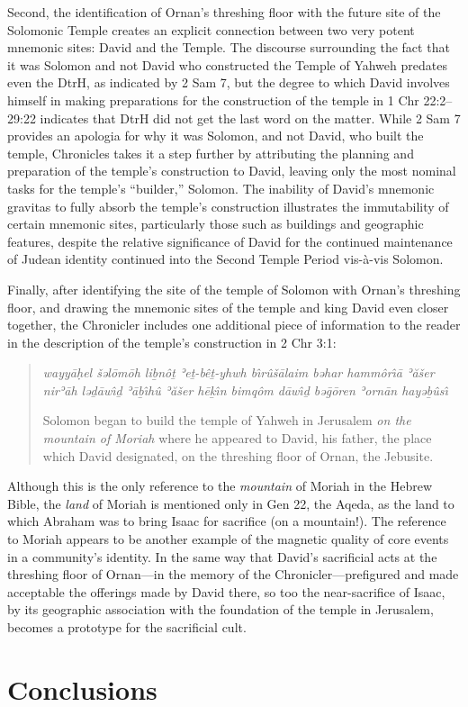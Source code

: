 Second, the identification of Ornan's threshing floor with the future
site of the Solomonic Temple creates an explicit connection between two
very potent mnemonic sites: David and the Temple. The discourse
surrounding the fact that it was Solomon and not David who constructed
the Temple of Yahweh predates even the DtrH, as indicated by 2 Sam 7,
but the degree to which David involves himself in making preparations
for the construction of the temple in 1 Chr 22:2--29:22 indicates that
DtrH did not get the last word on the matter. While 2 Sam 7 provides an
apologia for why it was Solomon, and not David, who built the temple,
Chronicles takes it a step further by attributing the planning and
preparation of the temple's construction to David, leaving only the most
nominal tasks for the temple's ``builder,'' Solomon. The inability of
David's mnemonic gravitas to fully absorb the temple's construction
illustrates the immutability of certain mnemonic sites, particularly
those such as buildings and geographic features, despite the relative
significance of David for the continued maintenance of Judean identity
continued into the Second Temple Period vis-à-vis Solomon.

Finally, after identifying the site of the temple of Solomon with
Ornan's threshing floor, and drawing the mnemonic sites of the temple
and king David even closer together, the Chronicler includes one
additional piece of information to the reader in the description of the
temple's construction in 2 Chr 3:1:

\begin{quote}
\emph{wayyāḥel šəlōmōh liḇnôṯ ʾeṯ-bêṯ-yhwh bı̂rûšālaim bəhar hammôrı̂ā
ʾăšer nirʾāh ləḏāwı̂ḏ ʾāḇı̂hû ʾăšer hēḵı̂n bimqôm dāwı̂ḏ bəḡōren ʾornān
hayəḇûsı̂}

Solomon began to build the temple of Yahweh in Jerusalem \emph{on the
mountain of Moriah} where he appeared to David, his father, the place
which David designated, on the threshing floor of Ornan, the Jebusite.
\end{quote}

Although this is the only reference to the \emph{mountain} of Moriah in
the Hebrew Bible, the \emph{land} of Moriah is mentioned only in Gen 22,
the Aqeda, as the land to which Abraham was to bring Isaac for sacrifice
(on a mountain!).\autocite[358--359]{kalimi_htr1990} The reference to
Moriah appears to be another example of the magnetic quality of core
events in a community's identity. In the same way that David's
sacrificial acts at the threshing floor of Ornan---in the memory of the
Chronicler---prefigured and made acceptable the offerings made by David
there, so too the near-sacrifice of Isaac, by its geographic association
with the foundation of the temple in Jerusalem, becomes a prototype for
the sacrificial cult.\autocite[In fact, Vermes makes this point explicit
and traces the tradition into early Christianity.
See][204--211]{vermes1961}

\section{Conclusions}\label{conclusions}
